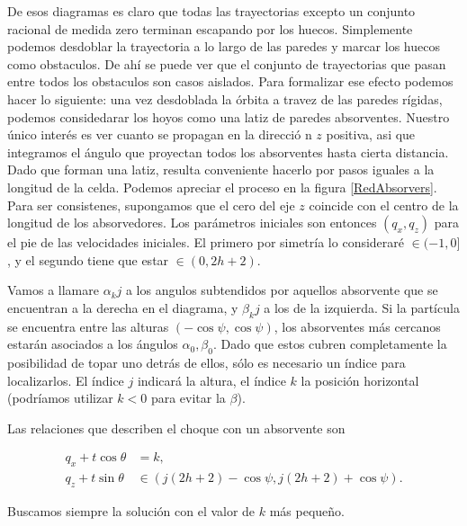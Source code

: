 \documentclass[letterpaper,12pt]{article}
\begin{document}
De esos diagramas es claro que todas las trayectorias excepto un conjunto 
racional de medida zero terminan escapando por los huecos. 
Simplemente podemos desdoblar la trayectoria a lo largo de las
paredes y marcar los huecos como obstaculos.
De ahí se puede ver que el conjunto de trayectorias que pasan
entre todos los obstaculos son casos aislados. Para formalizar 
ese efecto podemos hacer lo siguiente: una vez desdoblada
la órbita a travez de las paredes rígidas, podemos considedarar
los hoyos como una latiz de paredes absorventes. Nuestro único
interés es ver cuanto se propagan en la direcció n $z$ positiva, asi
que integramos el ángulo que proyectan todos los absorventes
hasta cierta distancia. Dado que forman una latiz, resulta conveniente
hacerlo por pasos iguales a la longitud de la celda. Podemos
apreciar el proceso en la figura \ref{RedAbsorvers}.
Para ser consistenes, supongamos que el cero del eje $z$ coincide con 
el centro de la longitud de los absorvedores. Los parámetros
iniciales son entonces $(q_x, q_z)$ para el pie de las velocidades
iniciales. El primero por simetría lo consideraré $\in (-1, 0]$,
y el segundo tiene que estar $\in (0, 2h+2)$.

Vamos a llamare $\alpha_kj$ a los angulos subtendidos por
 aquellos absorvente que se encuentran
a la derecha en el diagrama, y $\beta_kj$ a los de la izquierda. 
Si la partícula se encuentra entre las alturas $(-\cos \psi, \cos \psi)$,
los absorventes más cercanos estarán asociados a los ángulos
$\alpha_0, \beta_0$. Dado que estos cubren completamente la posibilidad
de topar uno detrás de ellos, sólo es necesario un índice 
para localizarlos. El índice $j$ indicará la altura, el índice
$k$ la posición horizontal (podríamos utilizar $k<0 $ para evitar
la $\beta$).  

Las relaciones que describen el choque con un absorvente son

\begin{align}
q_x+t \cos \theta & = k, \\
q_z+t\sin \theta  & \in  (j (2h+2)-\cos \psi, j (2h+2)+\cos \psi ).
\end{align}

Buscamos siempre la solución con el valor de $k$ más pequeño. 
\end{document}
